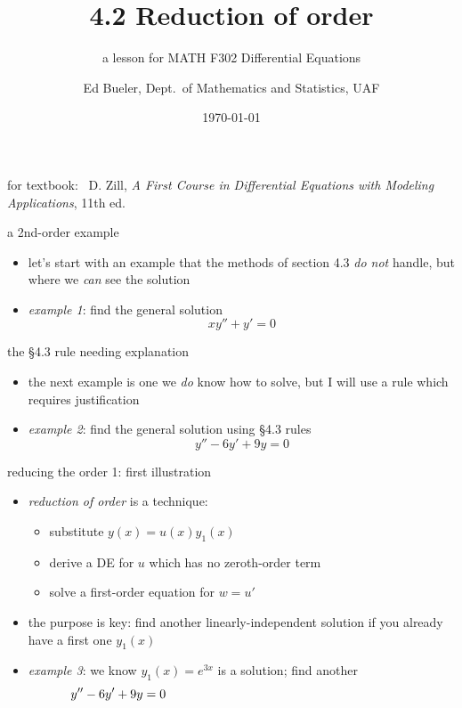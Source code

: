 \documentclass[dvipsnames]{beamer}
\title{4.2 Reduction of order}
\subtitle{a lesson for MATH F302 Differential Equations}
\author{Ed Bueler, Dept.~of Mathematics and Statistics, UAF}
\date{\tiny \today}
\begin{document}


\begin{frame}
\titlepage

\centerline{\tiny for textbook: \, D. Zill, \emph{A First Course in Differential Equations with Modeling Applications}, 11th ed.}
\end{frame}


\begin{frame}{a 2nd-order example}

\begin{itemize}
\item let's start with an example that the methods of section 4.3 \emph{do not} handle, but where we \emph{can} see the solution
\item \emph{example 1}: find the general solution
    $$x y'' + y' = 0$$
\end{itemize}

\vspace{50mm}
\end{frame}


\begin{frame}{the \S4.3 rule needing explanation}

\begin{itemize}
\item the next example is one we \emph{do} know how to solve, but I will use a rule which requires justification
\item \emph{example 2}:  find the general solution using \S4.3 rules
    $$y'' - 6 y' + 9 y = 0$$
\end{itemize}

\vspace{50mm}
\end{frame}


\begin{frame}{reducing the order 1: first illustration}

\begin{itemize}
\item \emph{reduction of order} is a technique:
    \begin{itemize}
    \item substitute $y(x) = u(x) y_1(x)$
    \item derive a DE for $u$ which has no zeroth-order term
    \item solve a first-order equation for $w=u'$
    \end{itemize}
\item the purpose is key: \alert{find another linearly-independent solution if you already have a first one $y_1(x)$}
\item \emph{example 3}:  we know $y_1(x)=e^{3x}$ is a solution; find another
    $$y'' - 6 y' + 9 y = 0 \hspace{70mm}$$
\end{itemize}

\vspace{50mm}
\end{frame}
\end{document}
